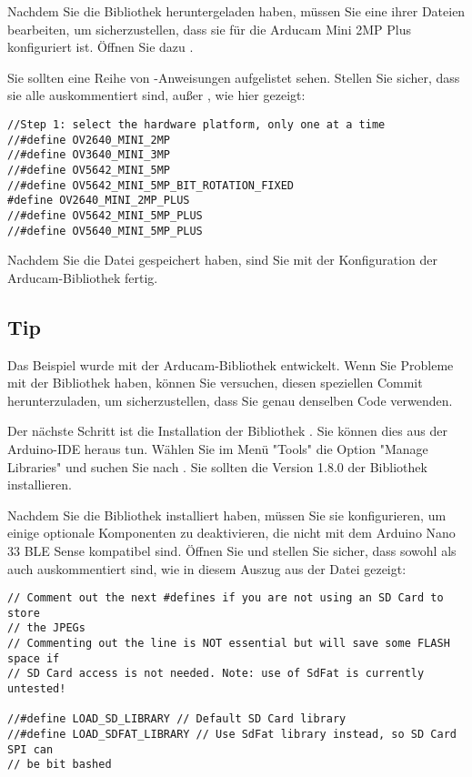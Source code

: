 Nachdem Sie die Bibliothek heruntergeladen haben, müssen Sie eine ihrer Dateien bearbeiten, um sicherzustellen, dass sie für die Arducam Mini 2MP Plus konfiguriert ist. Öffnen Sie dazu .

Sie sollten eine Reihe von -Anweisungen aufgelistet sehen. Stellen Sie sicher, dass sie alle auskommentiert sind, außer , wie hier gezeigt:

\begin{code}
    \begin{lstlisting}
//Step 1: select the hardware platform, only one at a time
//#define OV2640_MINI_2MP
//#define OV3640_MINI_3MP
//#define OV5642_MINI_5MP
//#define OV5642_MINI_5MP_BIT_ROTATION_FIXED
#define OV2640_MINI_2MP_PLUS
//#define OV5642_MINI_5MP_PLUS
//#define OV5640_MINI_5MP_PLUS
  \end{lstlisting}
\end{code}

Nachdem Sie die Datei gespeichert haben, sind Sie mit der Konfiguration der Arducam-Bibliothek fertig.

\subsection{Tip}

Das Beispiel wurde mit  der Arducam-Bibliothek entwickelt. Wenn Sie Probleme mit der Bibliothek haben, können Sie versuchen, diesen speziellen Commit herunterzuladen, um sicherzustellen, dass Sie genau denselben Code verwenden.

Der nächste Schritt ist die Installation der Bibliothek . Sie können dies aus der Arduino-IDE heraus tun. Wählen Sie im Menü "Tools" die Option "Manage Libraries" und suchen Sie nach . Sie sollten die Version 1.8.0 der Bibliothek installieren.

Nachdem Sie die Bibliothek installiert haben, müssen Sie sie konfigurieren, um einige optionale Komponenten zu deaktivieren, die nicht mit dem Arduino Nano 33 BLE Sense kompatibel sind. Öffnen Sie  und stellen Sie sicher, dass sowohl  als auch  auskommentiert sind, wie in diesem Auszug aus der Datei gezeigt:

\begin{code}
    \begin{lstlisting}
// Comment out the next #defines if you are not using an SD Card to store
// the JPEGs
// Commenting out the line is NOT essential but will save some FLASH space if
// SD Card access is not needed. Note: use of SdFat is currently untested!

//#define LOAD_SD_LIBRARY // Default SD Card library
//#define LOAD_SDFAT_LIBRARY // Use SdFat library instead, so SD Card SPI can
// be bit bashed
  \end{lstlisting}
\end{code}

